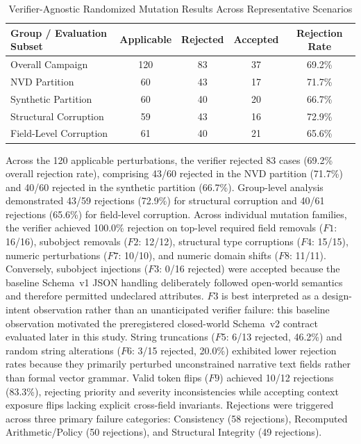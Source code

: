\documentclass[conference]{IEEEtran}
\begin{document}
\begin{table}[t]
\caption{Verifier-Agnostic Randomized Mutation Results Across Representative Scenarios}
\label{tab:random_mutation}
\centering
\small
\begin{tabular}{@{}lcccc@{}}
\toprule
Group / Evaluation Subset & Applicable & Rejected & Accepted & Rejection Rate \\
\midrule
Overall Campaign          & 120        & 83       & 37       & 69.2\% \\
NVD Partition             & 60         & 43       & 17       & 71.7\% \\
Synthetic Partition       & 60         & 40       & 20       & 66.7\% \\
Structural Corruption     & 59         & 43       & 16       & 72.9\% \\
Field-Level Corruption    & 61         & 40       & 21       & 65.6\% \\
\bottomrule
\end{tabular}
\end{table}

Across the 120 applicable perturbations, the verifier rejected 83 cases (69.2\% overall rejection rate), comprising 43/60 rejected in the NVD partition (71.7\%) and 40/60 rejected in the synthetic partition (66.7\%). Group-level analysis demonstrated 43/59 rejections (72.9\%) for structural corruption and 40/61 rejections (65.6\%) for field-level corruption. Across individual mutation families, the verifier achieved 100.0\% rejection on top-level required field removals ($F1$: 16/16), subobject removals ($F2$: 12/12), structural type corruptions ($F4$: 15/15), numeric perturbations ($F7$: 10/10), and numeric domain shifts ($F8$: 11/11). Conversely, subobject injections ($F3$: 0/16 rejected) were accepted because the baseline Schema~v1 JSON handling deliberately followed open-world semantics and therefore permitted undeclared attributes. $F3$ is best interpreted as a design-intent observation rather than an unanticipated verifier failure: this baseline observation motivated the preregistered closed-world Schema~v2 contract evaluated later in this study. String truncations ($F5$: 6/13 rejected, 46.2\%) and random string alterations ($F6$: 3/15 rejected, 20.0\%) exhibited lower rejection rates because they primarily perturbed unconstrained narrative text fields rather than formal vector grammar. Valid token flips ($F9$) achieved 10/12 rejections (83.3\%), rejecting priority and severity inconsistencies while accepting context exposure flips lacking explicit cross-field invariants. Rejections were triggered across three primary failure categories: Consistency (58 rejections), Recomputed Arithmetic/Policy (50 rejections), and Structural Integrity (49 rejections).
\end{document}
